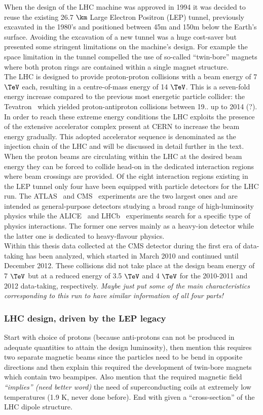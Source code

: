 When the design of the LHC machine was approved in 1994 it was decided to reuse the existing 26.7 $\km$ Large Electron Positron (LEP) tunnel, previously excavated in the 1980's and positioned between 45m and 150m below the Earth's surface.
Avoiding the excavation of a new tunnel was a huge cost-saver but presented some stringent limitations on the machine's design. For example the space limitation in the tunnel compelled the use of so-called ``twin-bore'' magnets where both proton rings are contained within a single magnet structure.
\\
The LHC is designed to provide proton-proton collisions with a beam energy of 7 $\TeV$ each, resulting in a centre-of-mass energy of 14 $\TeV$. This is a seven-fold energy increase compared to the previous most energetic particle collider: the Tevatron~\cite{} which yielded proton-antiproton collisions between 19.. up to 2014 (?). In order to reach these extreme energy conditions the LHC exploits the presence of the extensive accelerator complex present at CERN to increase the beam energy gradually. This adopted accelerator sequence is denominated as the injection chain of the LHC and will be discussed in detail further in the text.
\\
When the proton beams are circulating within the LHC at the desired beam energy they can be forced to collide head-on in the dedicated interaction regions where beam crossings are provided. Of the eight interaction regions existing in the LEP tunnel only four have been equipped with particle detectors for the LHC run. The ATLAS~\cite{} and CMS~\cite{} experiments are the two largest ones and are intended as general-purpose detectors studying a broad range of high-luminosity physics while the ALICE~\cite{} and LHCb~\cite{} experiments search for a specific type of physics interactions. The former one serves mainly as a heavy-ion detector while the latter one is dedicated to heavy-flavour physics.
\\
Within this thesis data collected at the CMS detector during the first era of data-taking has been analyzed, which started in March 2010 and continued until December 2012. These collisions did not take place at the design beam energy of 7 $\TeV$ but at a reduced energy of 3.5 $\TeV$ and 4 $\TeV$ for the 2010-2011 and 2012 data-taking, respectively. \textit{Maybe just put some of the main characteristics corresponding to this run to have similar information of all four parts!}

\subsubsection{LHC design, driven by the LEP legacy}
Start with choice of protons (because anti-protons can not be produced in adequate quantities to attain the design luminosity), then mention this requires two separate magnetic beams since the particles need to be bend in opposite directions and then explain this required the development of twin-bore magnets which contain two beampipes. Also mention that the required magnetic field \textit{``implies'' (need better word)} the need of superconducting coils at extremely low temperatures (1.9 K, never done before). End with given a ``cross-section'' of the LHC dipole structure.

